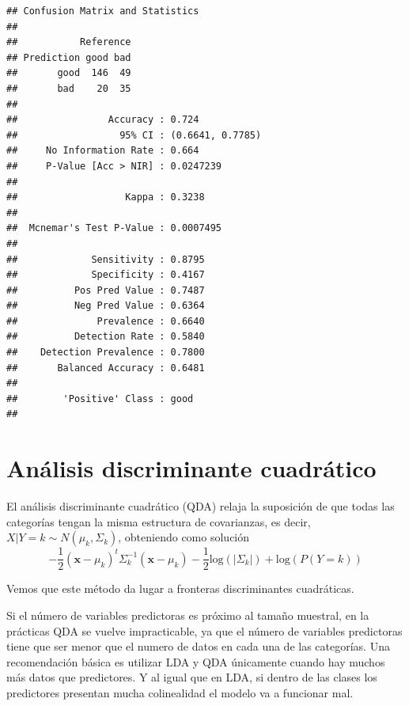 \documentclass[
  spanish,
]{book}
\newenvironment{Shaded}{\begin{snugshade}}{\end{snugshade}}
\newcommand{\NormalTok}[1]{#1}
\newcommand{\OperatorTok}[1]{\textcolor[rgb]{0.81,0.36,0.00}{\textbf{#1}}}
\theoremstyle{break}
\theoremstyle{definition}
\theoremstyle{definition}
\theoremstyle{definition}
\theoremstyle{remark}
\begin{document}
\begin{verbatim}
## Confusion Matrix and Statistics
## 
##           Reference
## Prediction good bad
##       good  146  49
##       bad    20  35
##                                           
##                Accuracy : 0.724           
##                  95% CI : (0.6641, 0.7785)
##     No Information Rate : 0.664           
##     P-Value [Acc > NIR] : 0.0247239       
##                                           
##                   Kappa : 0.3238          
##                                           
##  Mcnemar's Test P-Value : 0.0007495       
##                                           
##             Sensitivity : 0.8795          
##             Specificity : 0.4167          
##          Pos Pred Value : 0.7487          
##          Neg Pred Value : 0.6364          
##              Prevalence : 0.6640          
##          Detection Rate : 0.5840          
##    Detection Prevalence : 0.7800          
##       Balanced Accuracy : 0.6481          
##                                           
##        'Positive' Class : good            
## 
\end{verbatim}

\begin{Shaded}
\end{Shaded}

\hypertarget{anuxe1lisis-discriminante-cuadruxe1tico}{%
\section{Análisis discriminante cuadrático}\label{anuxe1lisis-discriminante-cuadruxe1tico}}

El análisis discriminante cuadrático (QDA) relaja la suposición de que todas las categorías tengan la misma estructura de covarianzas, es decir, \(X | Y = k \sim N(\mu_k, \Sigma_k)\), obteniendo como solución
\[-\frac{1}{2} (\mathbf{x} - \mu_k)^t \Sigma^{-1}_k (\mathbf{x} - \mu_k) - \frac{1}{2} \mbox{log}(|\Sigma_k|) + \mbox{log}(P(Y = k))\]

Vemos que este método da lugar a fronteras discriminantes cuadráticas.

Si el número de variables predictoras es próximo al tamaño muestral, en la prácticas QDA se vuelve impracticable, ya que el número de variables predictoras tiene que ser menor que el numero de datos en cada una de las categorías. Una recomendación básica es utilizar LDA y QDA únicamente cuando hay muchos más datos que predictores. Y al igual que en LDA, si dentro de las clases los predictores presentan mucha colinealidad el modelo va a funcionar mal.
\end{document}
